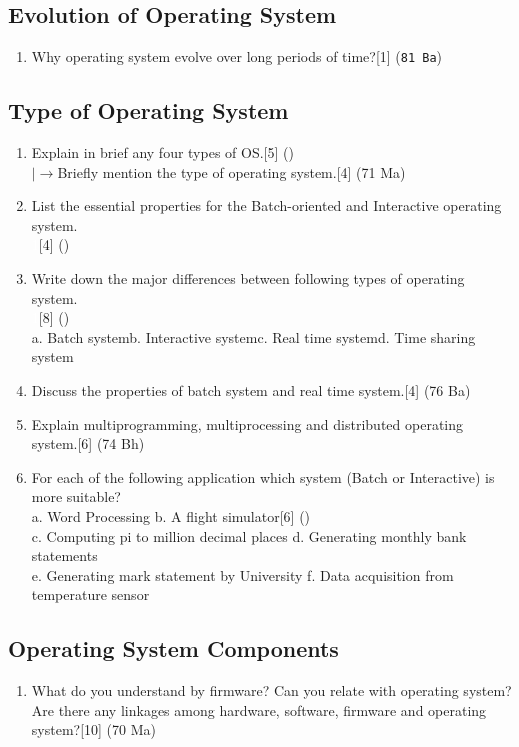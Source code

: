 \documentclass[12pt]{article}
\newcommand{\lb}{\\$\left|\rightarrow\right.$}
\newcommand{\enter}{\\\textcolor{white}{1}}
\begin{document}
	\subsection{Evolution of Operating System}
	\begin{enumerate}
	\item Why operating system evolve over long periods of time?\hfill[1] (\texttt{81 Ba})
	\end{enumerate}
	\subsection{Type of Operating System}
	\begin{enumerate}
	\item Explain in brief any four types of OS.\hfill[5] ()
	\lb Briefly mention the type of operating system.\hfill[4] (71 Ma)
	\item List the essential properties for the Batch-oriented and Interactive operating system.
	\enter\hfill[4] ()
	\item Write down the major differences between following types of operating system.
	\enter\hfill[8] ()\\
	a. Batch system\hspace{7mm}b. Interactive system\hspace{7mm}c. Real time system\hspace{7mm}d. Time sharing system
	\item Discuss the properties of batch system and real time system.\hfill[4] (76 Ba)
	\item Explain multiprogramming, multiprocessing and distributed operating system.\hfill[6] (74 Bh)
	\item For each of the following application which system (Batch or Interactive) is more suitable?\\
	a. Word Processing \hspace{5cm}b. A flight simulator\hfill[6] ()\\
	c. Computing pi to million decimal places\hspace{9mm} d. Generating monthly bank statements\\ 
	e. Generating mark statement by University \hspace{7mm}f. Data acquisition from temperature sensor
	\end{enumerate}
	\subsection{Operating System Components}
	\begin{enumerate}
	\item What do you understand by firmware? Can you relate with operating system? Are there any linkages among hardware, software, firmware and operating system?\hfill[10] (70 Ma)
	\end{enumerate}
\end{document}
